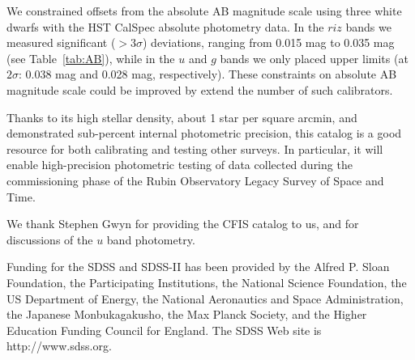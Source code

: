 \documentclass{aastex63}
\begin{document}
We constrained offsets from the absolute AB magnitude scale using three white dwarfs with the 
HST CalSpec absolute photometry data. In the $riz$ bands we measured significant ($>3\sigma$) 
deviations, ranging from 0.015 mag to 0.035 mag (see Table~\ref{tab:AB}), while in the $u$ and $g$ 
bands we only placed upper limits (at $2\sigma$: 0.038 mag and 0.028 mag, respectively). These
constraints on absolute AB magnitude scale could be improved by extend the number of such 
calibrators.

Thanks to its high stellar density, about 1 star per square arcmin, and demonstrated sub-percent 
internal photometric precision, this catalog is a good resource for both calibrating and testing 
other surveys. In particular, it will enable high-precision photometric testing of data collected 
during the commissioning phase of the Rubin Observatory Legacy Survey of Space and Time. 
  

\acknowledgments

We thank Stephen Gwyn for providing the CFIS catalog to us, and for discussions of the
$u$ band photometry. 

Funding for the SDSS and SDSS-II has been provided by the Alfred P. Sloan Foundation, the Participating
Institutions, the National Science Foundation, the US Department of Energy, the National Aeronautics and 
Space Administration, the Japanese Monbukagakusho, the Max Planck Society, and the Higher Education 
Funding Council for England. The SDSS Web site is http://www.sdss.org.
 
\vspace{5mm}


{}


%
 
\end{document}
